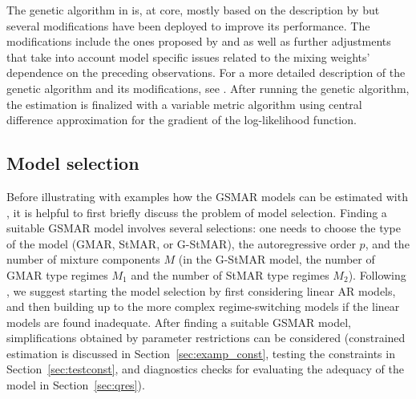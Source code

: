 \documentclass[nojss]{jss} %
\begin{document}
The genetic algorithm in  is, at core, mostly based on the description by \cite{Dorsey+Mayer:1995} but several modifications have been deployed to improve its performance. The modifications include the ones proposed by \cite{Patnaik+Srinivas:1994} and \cite{Smith+Dike+Stegmann:1995} as well as further adjustments that take into account model specific issues related to the mixing weights' dependence on the preceding observations. For a more detailed description of the genetic algorithm and its modifications, see \citet[Appendix A]{Virolainen:2020}. After running the genetic algorithm, the estimation is finalized with a variable metric algorithm \cite[algorithm 21, implemented by \citealp{R}]{Nash:1990} using central difference approximation for the gradient of the log-likelihood function.


\subsection{Model selection}\label{sec:modelselection}
Before illustrating with examples how the GSMAR models can be estimated with , it is helpful to first briefly discuss the problem of model selection. Finding a suitable GSMAR model involves several selections: one needs to choose the type of the model (GMAR, StMAR, or G-StMAR), the autoregressive order $p$, and the number of mixture components $M$ (in the G-StMAR model, the number of GMAR type regimes $M_1$ and the number of StMAR type regimes $M_2$). Following \citet[Section 3.1]{Kalliovirta+Meitz+Saikkonen:2015}, we suggest starting the model selection by first considering linear AR models, and then building up to the more complex regime-switching models if the linear models are found inadequate. After finding a suitable GSMAR model, simplifications obtained by parameter restrictions can be considered (constrained estimation is discussed in Section~\ref{sec:examp_const}, testing the constraints in Section~\ref{sec:testconst}, and diagnostics checks for evaluating the adequacy of the model in Section~\ref{sec:qres}).
\end{document}
